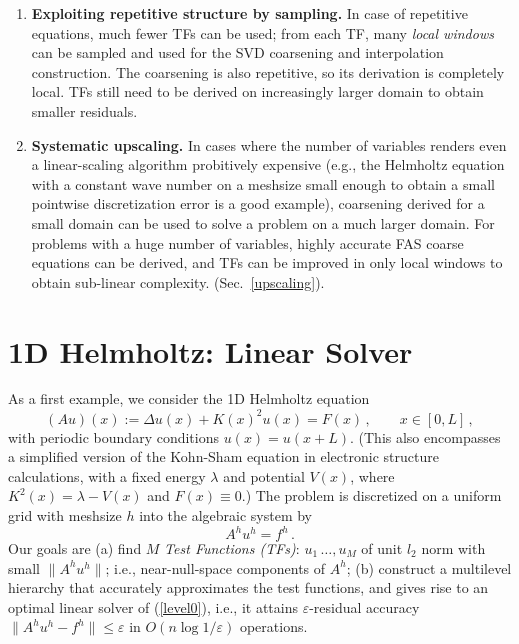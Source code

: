 \documentclass{article}
\begin{document}
\begin{enumerate}
	\item {\bf Exploiting repetitive structure by sampling.} In case of repetitive equations, much fewer TFs can be used; from each TF, many {\it local windows} can be sampled and used for the SVD coarsening and interpolation construction. The coarsening is also repetitive, so its derivation is completely local. TFs still need to be derived on increasingly larger domain to obtain smaller residuals.
	\item {\bf Systematic upscaling.} In cases where the number of variables renders even a linear-scaling algorithm probitively expensive (e.g., the Helmholtz equation with a constant wave number on a meshsize small enough to obtain a small pointwise discretization error is a good example), coarsening derived for a small domain can be used to solve a problem on a much larger domain. For problems with a huge number of variables, highly accurate FAS coarse equations can be derived, and TFs can be improved in only local windows to obtain sub-linear complexity. (Sec.~\ref{upscaling}).
\end{enumerate}

\section{1D Helmholtz: Linear Solver}
\label{helm_linear}
As a first example, we consider the 1D Helmholtz equation
\begin{equation}
	\label{helm1d}
	(A u)(x) := \Delta u(x) + K(x)^2 u(x) = F(x)\,,\qquad x \in [0,L]\,,
\end{equation}
with periodic boundary conditions $u(x) = u(x + L)$. (This also encompasses a simplified version of the Kohn-Sham equation in electronic structure calculations, with a fixed energy $\lambda$ and potential $V(x)$, where $K^2(x) = \lambda - V(x)$ and $F(x) \equiv 0$.) The problem is discretized on a uniform grid with meshsize $h$ into the algebraic system by
\begin{equation}
	\label{level0}
	A^h u^h = f^h\,.
\end{equation}
Our goals are (a) find $M$ \emph{Test Functions (TFs)}: $u_1\,\dots,u_M$ of unit $l_2$ norm with small $\|A^h u^h\|$; i.e., near-null-space components of $A^h$; (b) construct a multilevel hierarchy that accurately approximates the test functions, and gives rise to an optimal linear solver of (\ref{level0}), i.e., it attains $\varepsilon$-residual accuracy $\|A^h u^h - f^h \| \leq\varepsilon$ in $O(n \log 1/\varepsilon)$ operations.
\end{document}
